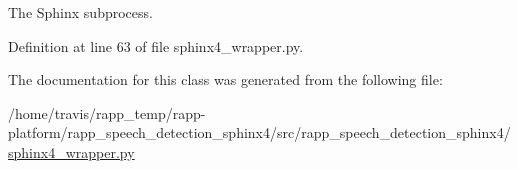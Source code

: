The Sphinx subprocess. 



Definition at line 63 of file sphinx4\-\_\-wrapper.\-py.



The documentation for this class was generated from the following file\-:\begin{DoxyCompactItemize}
\item 
/home/travis/rapp\-\_\-temp/rapp-\/platform/rapp\-\_\-speech\-\_\-detection\-\_\-sphinx4/src/rapp\-\_\-speech\-\_\-detection\-\_\-sphinx4/\hyperlink{sphinx4__wrapper_8py}{sphinx4\-\_\-wrapper.\-py}\end{DoxyCompactItemize}
